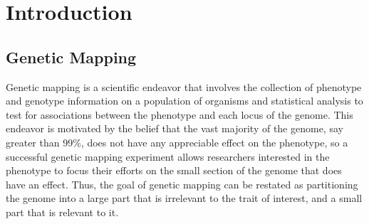 \chapter{Introduction}

\section{Genetic Mapping}

Genetic mapping is a scientific endeavor that involves the collection of phenotype and genotype information on a population of organisms and statistical analysis to test for associations between the phenotype and each locus of the genome.
This endeavor is motivated by the belief that the vast majority of the genome, say greater than 99\%, does not have any appreciable effect on the phenotype, so a successful genetic mapping experiment allows researchers interested in the phenotype to focus their efforts on the small section of the genome that does have an effect.
Thus, the goal of genetic mapping can be restated as partitioning the genome into a large part that is irrelevant to the trait of interest, and a small part that is relevant to it.

